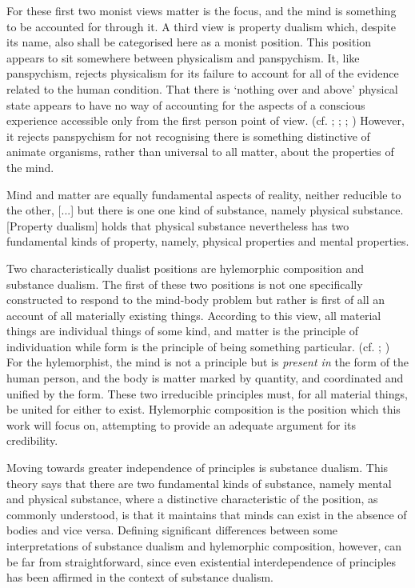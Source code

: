 For these first two monist views matter is the focus, and the mind is something to be accounted for through it.
A third view is property dualism which, despite its name, also shall be categorised here as a monist position.
This position appears to sit somewhere between physicalism and panspychism. It, like panspychism, rejects physicalism for its failure to account for all of the evidence related to the human condition.
That there is `nothing over and above' physical state appears to have no way of accounting for the aspects of a conscious experience accessible only from the first person point of view.
(cf. \cite[][]{Nagel1974-NAGWII}; \cite[][]{Levine1983-LEVMAQ}; \cite[][]{Jackson1982-JACEQ}; \cite[][]{Chalmers1996-CHATCM})
However, it rejects panspychism for not recognising there is something distinctive of animate organisms, rather than universal to all matter, about the properties of the mind.
\begin{quoting}
Mind and matter are equally fundamental aspects of reality, neither reducible to the other, [...] but there is one one kind of substance, namely physical substance. {[Property dualism]} holds that physical substance nevertheless has two fundamental kinds of property, namely, physical properties and mental properties.
\parencite[][244]{feser2006philosophy}
\end{quoting}

Two characteristically dualist positions are hylemorphic composition and substance dualism. The first of these two positions is not one specifically constructed to respond to the mind-body problem but rather is first of all an account of all materially existing things.
According to this view, all material things are individual things of some kind, and matter is the principle of individuation while form is the principle of being something particular.
(cf. \cite[][]{Oderberg2005-ODEHD}; \cite[][]{feser2014scholastic})
For the hylemorphist, the mind is not a principle but is \emph{present in} the form of the human person, and the body is matter marked by quantity, and coordinated and unified by the form. These two irreducible principles must, for all material things, be united for either to exist. Hylemorphic composition is the position which this work will focus on, attempting to provide an adequate argument for its credibility.

Moving towards greater independence of principles is substance dualism. This theory says that there are two fundamental kinds of substance, namely mental and physical substance, where a distinctive characteristic of the position, as commonly understood, is that it maintains that minds can exist in the absence of bodies and vice versa.
Defining significant differences between some interpretations of substance dualism and hylemorphic composition, however, can be far from straightforward, since even existential interdependence of principles has been affirmed in the context of substance dualism.
\parencite[][]{Lowe2006-LOWNSD}


